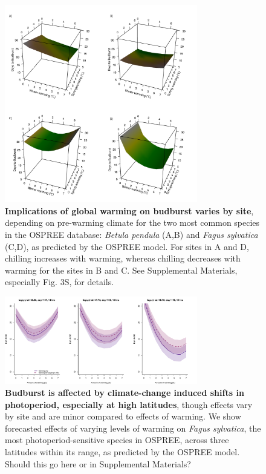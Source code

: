 \documentclass{article}
\begin{document}
\begin{figure}[h!]
\centering
\noindent \includegraphics[width=0.75\textwidth]{..//..//analyses/bb_analysis/figures/forecasting/bbmod_3dplot_utah_obs.pdf}
\caption{\textbf{Implications of global warming on budburst varies by site}, depending on pre-warming climate for the two most common species in the OSPREE database: \emph{Betula pendula} (A,B) and \emph{Fagus sylvatica} (C,D), as predicted by the OSPREE model. For sites in A and D, chilling increases with warming, whereas chilling decreases with warming for the sites in B and C. See Supplemental Materials, especially Fig. 3S, for details.}
\label{fig:fore}
\end{figure}

\begin{figure}[h!]
\centering
\noindent \includegraphics[width=0.75\textwidth]{..//..//analyses/bb_analysis/figures/forecasting/fagsyl_3lats.pdf}
\caption{\textbf{Budburst is affected by climate-change induced shifts in photoperiod, especially at high latitudes}, though effects vary by site and are minor compared to effects of warming. We show forecasted effects of varying levels of warming on \emph{Fagus sylvatica}, the most photoperiod-sensitive species in OSPREE, across three latitudes within its range, as predicted by the OSPREE model. Should this go here or in Supplemental Materials?}
\label{fig:fagsyllat}
\end{figure}

\end{document}
